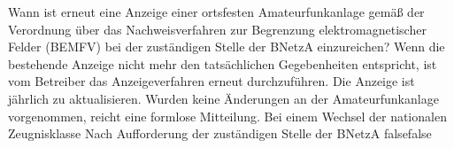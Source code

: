     {Wann ist erneut eine Anzeige einer ortsfesten Amateurfunkanlage gemäß der Verordnung über das Nachweisverfahren zur Begrenzung elektromagnetischer Felder (BEMFV) bei der zuständigen Stelle der BNetzA einzureichen?}
    {Wenn die bestehende Anzeige nicht mehr den tatsächlichen Gegebenheiten entspricht, ist vom Betreiber das Anzeigeverfahren erneut durchzuführen.}
    {Die Anzeige ist jährlich zu aktualisieren. Wurden keine Änderungen an der Amateurfunkanlage vorgenommen, reicht eine formlose Mitteilung.}
    {Bei einem Wechsel der nationalen Zeugnisklasse}
    {Nach Aufforderung der zuständigen Stelle der BNetzA}
    {false}{false}